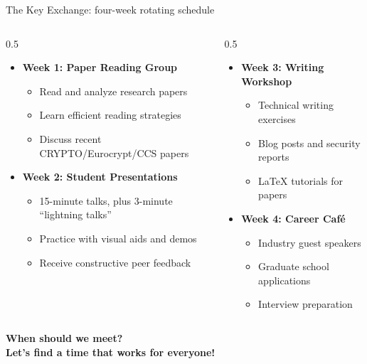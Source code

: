 \ifdefined\PRESENTATION\else\PassOptionsToClass{handout}{beamer}\fi\documentclass[aspectratio=169, lualatex]{beamer}
\begin{document}
\begin{frame}{The Key Exchange: four-week rotating schedule}
	\begin{columns}[c]
		\begin{column}{0.5\textwidth}
			\begin{itemize}[<+->]
				\item \textbf{Week 1: Paper Reading Group}
				      \begin{itemize}
					      \item Read and analyze research papers
					      \item Learn efficient reading strategies
					      \item Discuss recent CRYPTO/Eurocrypt/CCS papers
				      \end{itemize}
				\item \textbf{Week 2: Student Presentations}
				      \begin{itemize}
					      \item 15-minute talks, plus 3-minute ``lightning talks''
					      \item Practice with visual aids and demos
					      \item Receive constructive peer feedback
				      \end{itemize}
			\end{itemize}
		\end{column}
		\begin{column}{0.5\textwidth}
			\begin{itemize}[<+->]
				\item \textbf{Week 3: Writing Workshop}
				      \begin{itemize}
					      \item Technical writing exercises
					      \item Blog posts and security reports
					      \item LaTeX tutorials for papers
				      \end{itemize}
				\item \textbf{Week 4: Career Caf\'e}
				      \begin{itemize}
					      \item Industry guest speakers
					      \item Graduate school applications
					      \item Interview preparation
				      \end{itemize}
			\end{itemize}
		\end{column}
	\end{columns}
	\pause
	\vspace{0.1cm}
	\begin{center}
		\Large\textcolor{cipherprimary}{\textbf{When should we meet? \\ Let's find a time that works for everyone!}}
	\end{center}
\end{frame}
\end{document}
